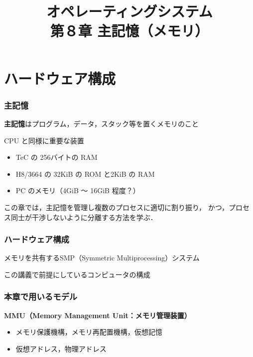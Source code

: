 \documentclass{beamer}                   %
\begin{document}
\title[主記憶]{オペレーティングシステム\\第８章 主記憶（メモリ）}
\date{}

\begin{frame}
  \titlepage
\end{frame}


\section{ハードウェア構成}
\begin{frame}
  \frametitle{主記憶}

{\bf 主記憶}はプログラム，データ，スタック等を置くメモリのこと

CPU と同様に重要な装置

\begin{itemize}
\item TeC の 256バイトの RAM
\item H8/3664 の 32KiB の ROM と2KiB の RAM
\item PC のメモリ（4GiB 〜 16GiB 程度？）
\end{itemize}

この章では，主記憶を管理し複数のプロセスに適切に割り振り，
かつ，プロセス同士が干渉しないように分離する方法を学ぶ．
\end{frame}

\begin{frame}
  \frametitle{ハードウェア構成}
  メモリを共有するSMP（Symmetric Multiprocessing）システム
  \begin{center}
    この講義で前提にしているコンピュータの構成
  \end{center}
\end{frame}

\begin{frame}
  \frametitle{本章で用いるモデル}
      {\bf MMU（Memory Management Unit：メモリ管理装置）}
      \begin{itemize}
      \item メモリ保護機構，メモリ再配置機構，仮想記憶
      \item 仮想アドレス，物理アドレス
      \end{itemize}
\end{frame}
\end{document}
